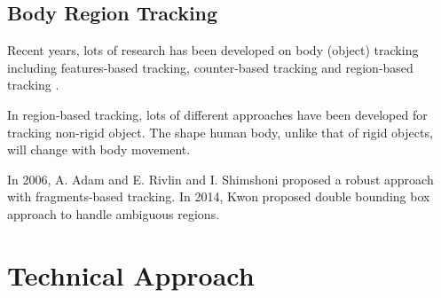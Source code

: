 \documentclass[11pt,twocolumn,letterpaper]{article}
\begin{document}
  \subsection{Body Region Tracking}
  Recent years, lots of research has been developed on body (object) tracking including features-based tracking, counter-based tracking \cite{panin2006efficient} and region-based tracking \cite{1640835}.
  \par
  In region-based tracking, lots of different approaches have been developed for tracking non-rigid object. The shape human body, unlike that of rigid objects, will change with body movement.
  \par
  In 2006, A. Adam and E. Rivlin and I. Shimshoni proposed a robust approach with fragments-based tracking. In 2014, Kwon proposed double bounding box approach to handle ambiguous regions. \cite{Kwon2014}

\section{Technical Approach}
\end{document}
